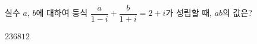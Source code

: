 실수 $a$, $b$에 대하여 등식 $\dfrac{a}{1-i}+\dfrac{b}{1+i}=2+i$가 성립할 때, $ab$의 값은?
\begin{choices32}{$2$}{$3$}{$6$}{$8$}{$12$}\end{choices32}
